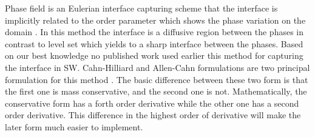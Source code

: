 \documentclass[letterpaper,10pt]{article}
\begin{document}

Phase field is an Eulerian interface capturing scheme that the interface is implicitly related to the order parameter which shows the phase variation on the domain \cite{Anderson1998}. In this method the interface is a diffusive region between the phases in contrast to level set which yields to a sharp interface between the phases. Based on our best knowledge no published work used earlier this method for capturing the interface in SW.
Cahn-Hilliard and Allen-Cahn formulations are two principal formulation for this method \cite{CahnHilliard1958i,CahnHilliard1958ii,Yang2006}. The basic difference between these two form is that the first one is mass conservative, and the second one is not. Mathematically, the conservative form has a forth order derivative while the other one has a second order derivative. This difference in the highest order of derivative will make the later form much easier to implement.\newline


\end{document}
